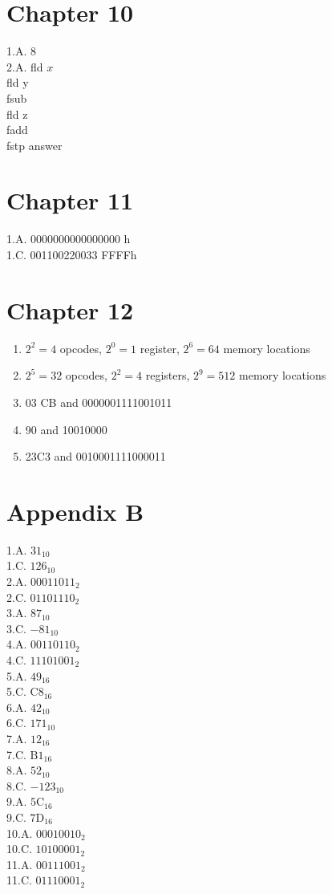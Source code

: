 \documentclass[10pt]{book}
\begin{document}
\section{Chapter 10}
1.A. 8\\
2.A. fld $x$\\
fld y\\
fsub\\
fld z\\
fadd\\
fstp answer

\section{Chapter 11}
1.A. 0000000000000000 h\\
1.C. 001100220033 FFFFh

\section{Chapter 12}
\begin{enumerate}
  \item $2^{2}=4$ opcodes, $2^{0}=1$ register, $2^{6}=64$ memory locations
  \item $2^{5}=32$ opcodes, $2^{2}=4$ registers, $2^{9}=512$ memory locations
  \item 03 CB and 0000001111001011
  \item 90 and 10010000
  \item 23C3 and 0010001111000011
\end{enumerate}
\section{Appendix B}
1.A. $31_{10}$\\
1.C. $126_{10}$\\
2.A. $00011011_{2}$\\
2.C. $01101110_{2}$\\
3.A. $87_{10}$\\
3.C. $-81_{10}$\\
4.A. $00110110_{2}$\\
4.C. $11101001_{2}$\\
5.A. $49_{16}$\\
5.C. $\mathrm{C8}_{16}$\\
6.A. $42_{10}$\\
6.C. $171_{10}$\\
7.A. $12_{16}$\\
7.C. $\mathrm{B1}_{16}$\\
8.A. $52_{10}$\\
8.C. $-123_{10}$\\
9.A. $\mathrm{5C}_{16}$\\
9.C. $\mathrm{7D}_{16}$\\
10.A. $00010010_{2}$\\
10.C. $10100001_{2}$\\
11.A. $00111001_{2}$\\
11.C. $01110001_{2}$
\end{document}
